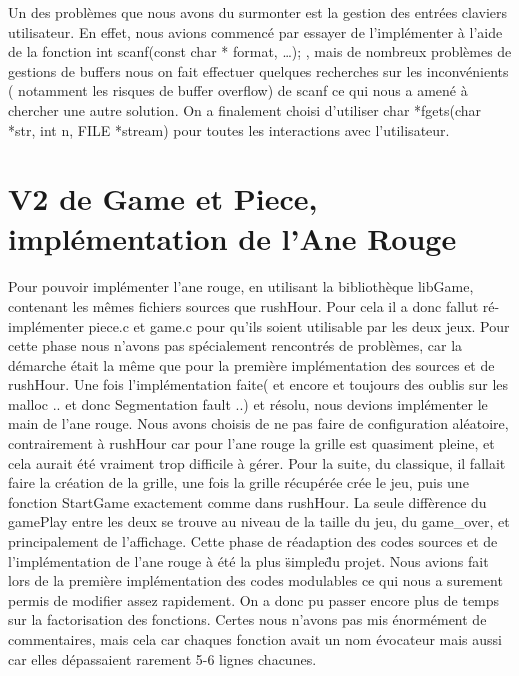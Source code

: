 \documentclass {article}
\begin{document}
Un des problèmes que nous avons du surmonter est la gestion des entrées claviers utilisateur. En effet, nous avions commencé par essayer de l'implémenter à l'aide de la fonction \og int scanf(const char * format, …); \fg{}, mais de nombreux problèmes de gestions de buffers nous on fait effectuer quelques recherches sur les inconvénients ( notamment les risques de buffer overflow)  de scanf ce qui nous a amené à chercher une autre solution. On a finalement choisi d'utiliser \og char *fgets(char *str, int n, FILE *stream) \fg{} pour toutes les interactions avec l'utilisateur.

\section{V2 de Game et Piece, implémentation de l'Ane Rouge}
\paragraph{}
Pour pouvoir implémenter l'ane rouge, en utilisant la bibliothèque libGame, contenant les mêmes fichiers sources que rushHour. Pour cela il a donc fallut ré-implémenter piece.c et game.c pour qu'ils soient utilisable par les deux jeux. Pour cette phase nous n'avons pas spécialement rencontrés de problèmes, car la démarche était la même que pour la première implémentation des sources et de rushHour. Une fois l'implémentation faite( et encore et toujours des oublis sur les malloc .. et donc Segmentation fault ..) et résolu, nous devions implémenter le main de l'ane rouge. Nous avons choisis de ne pas faire de configuration aléatoire, contrairement à rushHour car pour l'ane rouge la grille est quasiment pleine, et cela aurait été vraiment trop difficile à gérer. Pour la suite, du classique, il fallait faire la création de la grille, une fois la grille récupérée crée le jeu, puis une fonction StartGame exactement comme dans rushHour. La seule diffèrence du gamePlay entre les deux se trouve au niveau de la taille du jeu, du game\_over, et principalement de l'affichage. Cette phase de réadaption des codes sources et de l'implémentation de l'ane rouge à été la plus \"simple\" du projet. Nous avions fait lors de la première implémentation des codes modulables ce qui nous a surement permis de modifier assez rapidement. On a donc pu passer encore plus de temps sur la factorisation des fonctions. Certes nous n'avons pas mis énormément de commentaires, mais cela car chaques fonction avait un nom évocateur mais aussi car elles dépassaient rarement 5-6 lignes chacunes.
\end{document}
